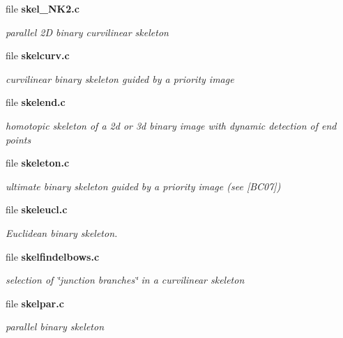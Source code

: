 \begin{CompactItemize}
\item 
file \bf{skel\_\-NK2.c}
\begin{CompactList}\small\item\em parallel 2D binary curvilinear skeleton \item\end{CompactList}

\item 
file \bf{skelcurv.c}
\begin{CompactList}\small\item\em curvilinear binary skeleton guided by a priority image \item\end{CompactList}

\item 
file \bf{skelend.c}
\begin{CompactList}\small\item\em homotopic skeleton of a 2d or 3d binary image with dynamic detection of end points \item\end{CompactList}

\item 
file \bf{skeleton.c}
\begin{CompactList}\small\item\em ultimate binary skeleton guided by a priority image (see [BC07]) \item\end{CompactList}

\item 
file \bf{skeleucl.c}
\begin{CompactList}\small\item\em Euclidean binary skeleton. \item\end{CompactList}

\item 
file \bf{skelfindelbows.c}
\begin{CompactList}\small\item\em selection of \char`\"{}junction branches\char`\"{} in a curvilinear skeleton \item\end{CompactList}

\item 
file \bf{skelpar.c}
\begin{CompactList}\small\item\em parallel binary skeleton \item\end{CompactList}


\end{CompactItemize}
